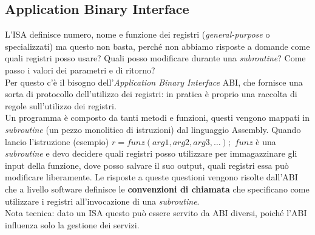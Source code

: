 \subsection{Application Binary Interface}
L'ISA definisce numero, nome e funzione dei registri (\textit{general-purpose} o  specializzati) ma questo non basta, perché non abbiamo risposte a domande come quali registri posso usare? Quali posso modificare durante una \textit{subroutine}? Come passo i valori dei parametri e di ritorno?\\
Per questo c’è il bisogno dell'\textit{Application Binary Interface} ABI, che fornisce una sorta di protocollo dell’utilizzo dei registri: in pratica è proprio una raccolta di regole sull’utilizzo dei registri.\\
Un programma è composto da tanti metodi e funzioni, questi vengono mappati in \textit{subroutine} (un pezzo monolitico di istruzioni) dal linguaggio Assembly.
Quando lancio l’istruzione (esempio)  $r=funz(arg1, arg2, arg3, …);$ $funz$ è una \textit{subroutine} e devo decidere quali registri posso utilizzare per immagazzinare gli input della funzione, dove posso salvare il suo output, quali registri essa può modificare liberamente. Le risposte a queste questioni vengono risolte dall’ABI che a livello software definisce le \textbf{convenzioni di chiamata} che specificano come utilizzare i registri all’invocazione di una \textit{subroutine}.\\
Nota tecnica: dato un ISA questo può essere servito da ABI diversi, poiché l’ABI influenza solo la gestione dei servizi.

